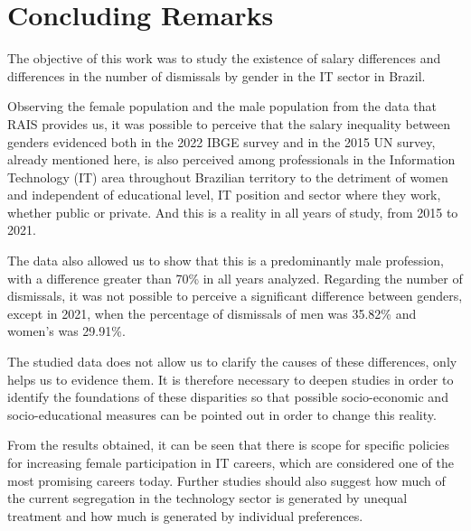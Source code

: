 \section{Concluding Remarks}

The objective of this work was to study the existence of salary differences and differences in the number of dismissals by gender in the IT sector in Brazil.

Observing the female population and the male population from the data that RAIS provides us, it was possible to perceive that the salary inequality between genders evidenced both in the 2022 IBGE survey and in the 2015 UN survey, already mentioned here, is also perceived among professionals in the Information Technology (IT) area throughout Brazilian territory to the detriment of women and independent of educational level, IT position and sector where they work, whether public or private. And this is a reality in all years of study, from 2015 to 2021.

The data also allowed us to show that this is a predominantly male profession, with a difference greater than 70\% in all years analyzed. Regarding the number of dismissals, it was not possible to perceive a significant difference between genders, except in 2021, when the percentage of dismissals of men was 35.82\% and women’s was 29.91\%.

The studied data does not allow us to clarify the causes of these differences, only helps us to evidence them. It is therefore necessary to deepen studies in order to identify the foundations of these disparities so that possible socio-economic and socio-educational measures can be pointed out in order to change this reality.

From the results obtained, it can be seen that there is scope for specific policies for increasing female participation in IT careers, which are considered one of the most promising careers today. Further studies should also suggest how much of the current segregation in the technology sector is generated by unequal treatment and how much is generated by individual preferences.




